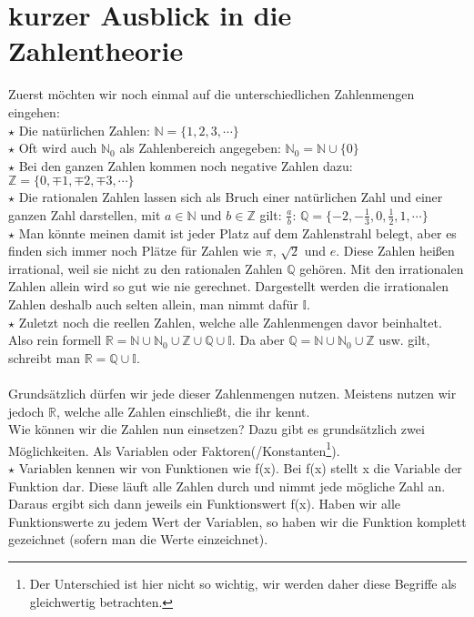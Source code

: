 \section{kurzer Ausblick in die Zahlentheorie}
Zuerst möchten wir noch einmal auf die unterschiedlichen Zahlenmengen eingehen: \\
\(\star\) Die natürlichen Zahlen: \(\mathbb{N}=\{1,2,3,\cdots\}\) \\
$\star$ Oft wird auch $\mathbb{N}_0$ als Zahlenbereich angegeben: $\mathbb{N}_0=\mathbb{N}\cup\{0\}$\\
\(\star\) Bei den ganzen Zahlen kommen noch negative Zahlen dazu: \(\mathbb{Z}=\{0,\mp 1,\mp 2,\mp 3,\cdots\}\) \\
\(\star\) Die rationalen Zahlen lassen sich als Bruch einer natürlichen Zahl und einer ganzen Zahl darstellen, mit $a\in\mathbb{N}$ und $b\in\mathbb{Z}$ gilt: \(\frac{a}{b}\): \(\mathbb{Q}=\{-2,-\frac{1}{3},0,\frac{1}{2},1,\cdots\}\) \\
$\star$ Man könnte meinen damit ist jeder Platz auf dem Zahlenstrahl belegt, aber es finden sich immer noch Plätze für Zahlen wie $\pi$, $\sqrt{2}$ und $e$. Diese Zahlen heißen irrational, weil sie nicht zu den rationalen Zahlen $\mathbb{Q}$ gehören. Mit den irrationalen Zahlen allein wird so gut wie nie gerechnet. Dargestellt werden die irrationalen Zahlen deshalb auch selten allein, man nimmt dafür $\mathbb{I}$.\\
\(\star\) Zuletzt noch die reellen Zahlen, welche alle Zahlenmengen davor beinhaltet. Also rein formell $\mathbb{R}=\mathbb{N}\cup\mathbb{N}_0\cup\mathbb{Z}\cup\mathbb{Q}\cup\mathbb{I}$. Da aber $\mathbb{Q}=\mathbb{N}\cup\mathbb{N}_0\cup\mathbb{Z}$ usw. gilt, schreibt man $\mathbb{R}=\mathbb{Q}\cup\mathbb{I}$. \\
\\
Grundsätzlich dürfen wir jede dieser Zahlenmengen nutzen. Meistens nutzen wir jedoch \(\mathbb{R}\), welche alle Zahlen einschließt, die ihr kennt. \\
Wie können wir die Zahlen nun einsetzen? Dazu gibt es grundsätzlich zwei Möglichkeiten. Als Variablen oder Faktoren(/Konstanten\footnote{Der Unterschied ist hier nicht so wichtig, wir werden daher diese Begriffe als gleichwertig betrachten.}).\\
\(\star\) Variablen kennen wir von Funktionen wie f(x). Bei f(x) stellt x die Variable der Funktion dar. Diese läuft alle Zahlen durch und nimmt jede mögliche Zahl an. Daraus ergibt sich dann jeweils ein Funktionswert f(x). Haben wir alle Funktionswerte zu jedem Wert der Variablen, so haben wir die Funktion komplett gezeichnet (sofern man die Werte einzeichnet). \\
